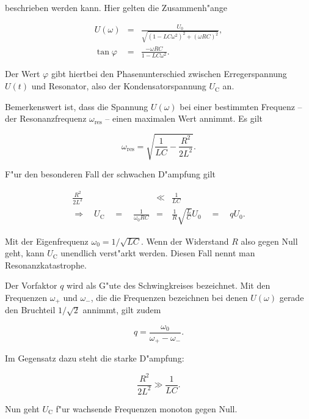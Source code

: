 		beschrieben werden kann.
		Hier gelten die Zusammenh"ange

		\begin{eqnarray*}
			U(\omega) & = & \frac{U_0}{\sqrt{\left( 1 - LC \omega^2 \right)^2 + \left( \omega RC\right)^2}}, \\
			\tan{\varphi} & = & \frac{-\omega RC}{1 - LC\omega^2}.
		\end{eqnarray*}

		Der Wert $\varphi$ gibt hiertbei den Phasenunterschied zwischen Erregerspannung $U(t)$ und Resonator, also der Kondensatorspannung $U_\mathrm{C}$ an.

		Bemerkenswert ist, dass die Spannung $U(\omega)$ bei einer bestimmten Frequenz -- der Resonanzfrequenz $\omega_\mathrm{res}$ -- einen maximalen Wert annimmt.
		Es gilt

		\begin{equation*}
			\omega_\mathrm{res} = \sqrt{\frac{1}{LC}-\frac{R^2}{2L^2}}.
		\end{equation*}

		F"ur den besonderen Fall der schwachen D"ampfung gilt

		\begin{eqnarray*}
			\frac{R^2}{2L^2} & \ll & \frac{1}{LC} \\
			\Rightarrow \quad U_\mathrm{C} \quad = \quad \frac{1}{\omega_0 RC} & = & \frac{1}{R} \sqrt{\frac{L}{C}} U_0 \quad = \quad q U_0.
		\end{eqnarray*}

		Mit der Eigenfrequenz $\omega_0 = 1/\sqrt{LC}$.
		Wenn der Widerstand $R$ also gegen Null geht, kann $U_\mathrm{C}$ unendlich verst"arkt werden.
		Diesen Fall nennt man Resonanzkatastrophe.

		Der Vorfaktor $q$ wird als G"ute des Schwingkreises bezeichnet.
		Mit den Frequenzen $\omega_+$ und $\omega_-$, die die Frequenzen bezeichnen bei denen $U(\omega)$ gerade den Bruchteil $1/\sqrt{2}$ annimmt, gilt zudem

		\begin{equation*}
			q = \frac{\omega_0}{\omega_+ - \omega_-}.
		\end{equation*}

		Im Gegensatz dazu steht die starke D"ampfung:

		\begin{equation*}
			\frac{R^2}{2L^2} \gg \frac{1}{LC}.
		\end{equation*}

		Nun geht $U_\mathrm{C}$ f"ur wachsende Frequenzen monoton gegen Null.

